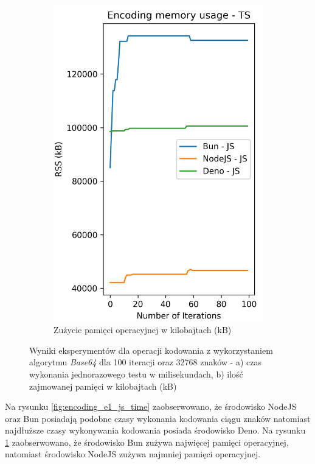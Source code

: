 \begin{figure}[H]
\begin{subfigure}[b]{0.42\textwidth}
    \includegraphics[width=\textwidth]{Figures/coding/base64_100_encoding_js_memory.png}
    \caption{Zużycie pamięci operacyjnej w kilobajtach (kB)}
    \label{fig:encoding_e1_js_memory}
  \end{subfigure}
  \hfill
  \caption{Wyniki eksperymentów dla operacji kodowania z wykorzystaniem algorytmu \textit{Base64} dla 100 iteracji oraz 32768 znaków - a) czas wykonania jednorazowego testu w milisekundach, b) ilość zajmowanej pamięci w kilobajtach (kB)}
  \label{fig:encoding_e1_js}
\end{figure}

Na rysunku \ref{fig:encoding_e1_js_time} zaobserwowano, że środowisko NodeJS oraz Bun posiadają podobne czasy wykonania kodowania ciągu znaków natomiast najdłuższe czasy wykonywania kodowania posiada środowisko Deno. Na rysunku \ref{fig:encoding_e1_js_memory} zaobserwowano, że środowisko Bun zużywa najwięcej pamięci operacyjnej, natomiast środowisko NodeJS zużywa najmniej pamięci operacyjnej.

